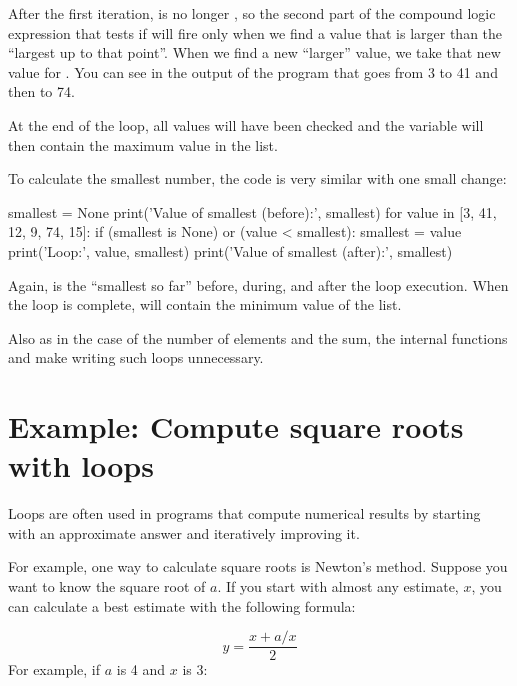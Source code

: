 After the first iteration,  is no longer , so the second part of the compound logic expression that tests if  will fire only when we find a value that is larger than the ``largest up to that point''. When we find a new ``larger'' value, we take that new value for . You can see in the output of the program that  goes from 3 to 41 and then to 74.

At the end of the loop, all values will have been checked and the  variable will then contain the maximum value in the list.

To calculate the smallest number, the code is very similar with one small change:

\begin{python}[frame=single]
smallest = None
print('Value of smallest (before):', smallest)
for value in [3, 41, 12, 9, 74, 15]:
    if (smallest is None) or (value < smallest):
        smallest = value
    print('Loop:', value, smallest)
print('Value of smallest (after):', smallest)
\end{python}

Again,  is the ``smallest so far'' before, during, and after the loop execution. When the loop is complete,  will contain the minimum value of the list.

Also as in the case of the number of elements and the sum, the internal functions  and  make writing such loops unnecessary.



\section{Example: Compute square roots with loops}
\label{squareroot}

Loops are often used in programs that compute numerical results by starting with an approximate answer and iteratively improving it.

For example, one way to calculate square roots is Newton's method. Suppose you want to know the square root of $a$. If you start with almost any estimate, $x$, you can calculate a best estimate with the following formula:

\[ y = \frac{x + a/x}{2} \]
%
For example, if $a$ is 4 and $x$ is 3:

